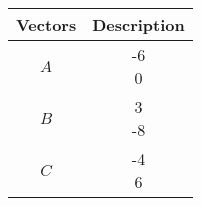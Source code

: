 \begin{tabular}{|c|c|}
        \hline
        Vectors & Description \\
        \hline
        $A$ & \myvec{-6\\0}\\
        \hline
        $B$ & \myvec{3\\-8}\\
        \hline
        $C$ & \myvec{-4\\6}\\
        \hline
\end{tabular}
